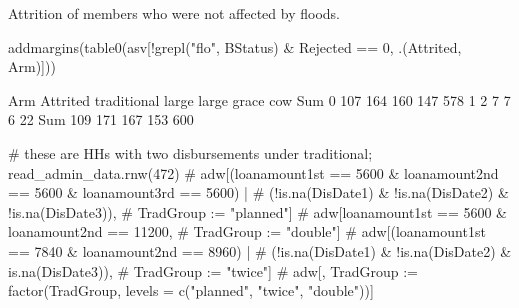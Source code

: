 Attrition of members who were not affected by floods.
\begin{Schunk}
\begin{Sinput}
addmargins(table0(asv[!grepl("flo", BStatus) & Rejected == 0, .(Attrited, Arm)]))
\end{Sinput}
\begin{Soutput}
        Arm
Attrited traditional large large grace cow Sum
     0           107   164         160 147 578
     1             2     7           7   6  22
     Sum         109   171         167 153 600
\end{Soutput}
\begin{Sinput}
# these are HHs with two disbursements under traditional; read_admin_data.rnw(472)
# adw[(loanamount1st == 5600 & loanamount2nd == 5600 & loanamount3rd == 5600) |
#   (!is.na(DisDate1) & !is.na(DisDate2) & !is.na(DisDate3)), 
#   TradGroup := "planned"]
# adw[loanamount1st == 5600 & loanamount2nd == 11200, 
#   TradGroup := "double"]
# adw[(loanamount1st == 7840 & loanamount2nd == 8960) | 
#   (!is.na(DisDate1) & !is.na(DisDate2) & is.na(DisDate3)), 
#   TradGroup := "twice"]
# adw[, TradGroup := factor(TradGroup, levels = c("planned", "twice", "double"))]
\end{Sinput}
\end{Schunk}
